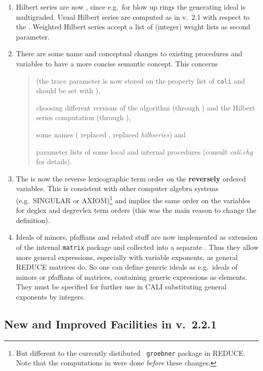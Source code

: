 \begin{enumerate}
\item Hilbert series are now , since
e.g.\ for blow up rings the generating ideal is multigraded. Usual
Hilbert series are computed as in v.\ 2.1 with respect to the
. Weighted Hilbert series accept a list of (integer)
weight lists as second parameter.

\item There are some name and conceptual changes to existing
procedures and variables to have a more concise semantic concept. This
concerns
\begin{quote}
 (the trace parameter is now stored on the property list
of {\tt cali} and should be set with ),

choosing different versions of the \gr algorithm (through
) and the Hilbert series computation (through
),

some names ( replaced , 
replaced {\em hilbseries}) and

parameter lists of some local and internal procedures (consult {\em
cali.chg} for details).
\end{quote}

\item The  is now the reverse lexicographic
term order on the {\bf reversely} ordered variables. This is consistent
with other computer algebra systems (e.g.\ SINGULAR or
AXIOM)\footnote{But different to the currently distibuted {\tt
groebner} package in REDUCE. Note that the computations in
\cite{fgb} were done {\em before} these changes.} and implies the same
order on the variables for deglex and degrevlex term orders (this was
the main reason to change the definition).

\item Ideals of minors, pfaffians and related stuff are now
implemented as extension of the internal {\tt matrix} package and
collected into a separate . Thus they allow more
general expressions, especially with variable exponents, as general
REDUCE matrices do. So one can define generic ideals as e.g.\ ideals
of minors or pfaffians of matrices, containing generic expressions as
elements. They must be specified for further use in CALI substituting
general exponents by integers.

\end{enumerate}

\subsection{New and Improved Facilities in v.\ 2.2.1\label{221}}

